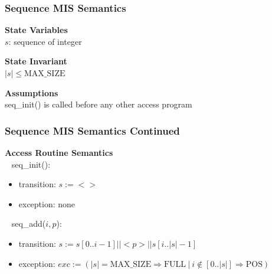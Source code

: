 \documentclass[t,12pt,numbers,fleqn]{beamer}
\begin{document}

\begin{frame}
\frametitle{Sequence MIS Semantics}

\textbf{State Variables}\\
$s$: sequence of integer
~\newline

\textbf{State Invariant}\\
$| s | \leq \mathrm{MAX\_SIZE}$
~\newline

\textbf{Assumptions}\\
seq\_init() is called before any other access program

\end{frame}


\begin{frame}
\frametitle{Sequence MIS Semantics Continued}

\textbf{Access Routine Semantics}\\
~\newline
seq\_init():
\begin{itemize}
\item transition: $s := < >$
\item exception: none
\end{itemize}
~\newline
\noindent seq\_add($i, p$):
\begin{itemize}
\item transition: $s := s[0..i-1] || <p> || s[i..|s|-1]$
\item exception: $exc := (|s| = \mathrm{MAX\_SIZE} \Rightarrow  \mathrm{FULL} ~ | ~ i \notin [0..|s|] \Rightarrow
\mathrm{POS})$
\end{itemize}

\end{frame}

\end{document}
